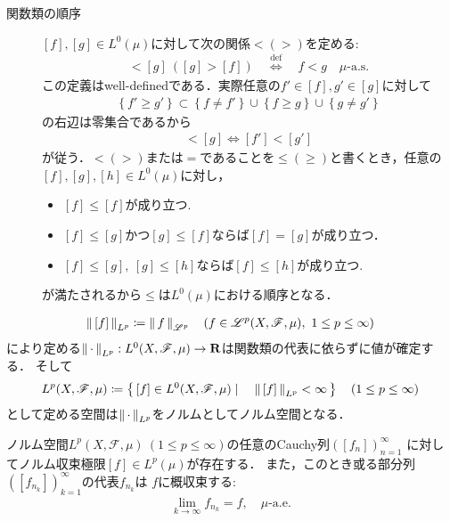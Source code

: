 \begin{description}
	\item[関数類の順序]
		$[f],[g] \in L^0(\mu)$に対して次の関係$<(>)$を定める:
		\begin{align}
			[f] < [g]\ \left( [g] > [f] \right) \quad
			\overset{\mathrm{def}}{\Longleftrightarrow}
			\quad f < g \quad \mbox{$\mu$-a.s.} \label{dfn:equiv_class_order}
		\end{align}
		この定義はwell-definedである．実際任意の$f' \in [f],g' \in [g]$に対して
		\begin{align}
			\left\{ f' \geq g' \right\} \subset \left\{ f \neq f' \right\} \cup \left\{ f \geq g \right\} \cup \left\{ g \neq g' \right\}
		\end{align}
		の右辺は零集合であるから
		\begin{align}
			[f] < [g] \Leftrightarrow [f'] < [g']
		\end{align}
		が従う．$<(>)$または$=$であることを$\leq(\geq)$と書くとき，任意の$[f],[g],[h] \in L^0(\mu)$に対し，
		\begin{itemize}
			\item $[f] \leq [f]$が成り立つ.
			\item $[f] \leq [g]$かつ$[g] \leq [f]$ならば$[f] = [g]$が成り立つ．
			\item $[f] \leq [g],\ [g] \leq [h]$ならば$[f] \leq [h]$が成り立つ.
		\end{itemize}
		が満たされるから$\leq$は$L^0(\mu)$における順序となる．
\end{description}

\begin{screen}
	\begin{dfn}[商空間におけるノルムの定義]
		\begin{align}
			\left\|\, [f]\, \right\|_{L^p} \coloneqq \left\|\, f\, \right\|_{\mathscr{L}^p} 
			\quad (f \in \mathscr{L}^p(X,\mathscr{F},\mu),\ 1 \leq p \leq \infty)
		\end{align}
		により定める$\left\|\, \cdot\, \right\|_{L^p}:L^0(X,\mathscr{F},\mu) \rightarrow \mathbf{R}$は関数類の代表に依らずに値が確定する．
		そして
		\begin{align}
			L^p(X,\mathscr{F},\mu) \coloneqq \left\{\, [f] \in L^0(X,\mathscr{F},\mu) \mid \quad \left\|\, [f]\, \right\|_{L^p} < \infty\, \right\} \quad (1 \leq p \leq \infty)
		\end{align}
		として定める空間は$\left\|\, \cdot\, \right\|_{L^p}$をノルムとしてノルム空間となる．
	\end{dfn}
\end{screen}

\begin{screen}
	\begin{thm}[$L^p$はBanach空間]\label{thm:Lp_banach}
		ノルム空間$L^p(X,\mathscr{F},\mu)\ (1 \leq p \leq \infty)$の任意のCauchy列$\left( [f_n] \right)_{n=1}^\infty$
		に対してノルム収束極限$[f] \in L^p(\mu)$が存在する．
		また，このとき或る部分列$\left( \left[f_{n_k}\right] \right)_{k=1}^\infty$の代表$f_{n_k}$は
		$f$に概収束する:
		\begin{align}
			\lim_{k \to \infty} f_{n_k} = f, \quad \mbox{$\mu$-a.e.}
		\end{align}
	\end{thm}
\end{screen}

